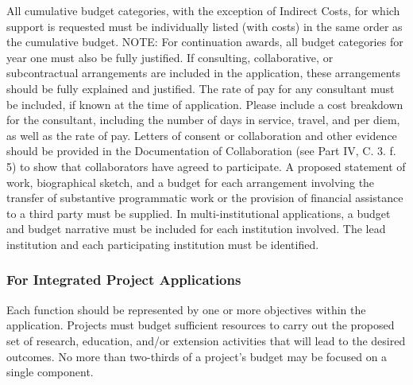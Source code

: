 \documentclass[12pt,letterpaper]{article}
\title{\ruleline{Budget Justification}}
\begin{document}
\maketitle
\linenumbers

All cumulative budget categories, with the exception of Indirect Costs, for
which support is requested must be individually listed (with costs) in the same
order as the cumulative budget. NOTE: For continuation awards, all budget
categories for year one must also be fully justified. If consulting,
collaborative, or subcontractual arrangements are included in the application,
these arrangements should be fully explained and justified. The rate of pay for
any consultant must be included, if known at the time of application. Please
include a cost breakdown for the consultant, including the number of days in
service, travel, and per diem, as well as the rate of pay. Letters of consent or
collaboration and other evidence should be provided in the Documentation of
Collaboration (see Part IV, C. 3. f. 5) to show that collaborators have agreed
to participate. A proposed statement of work, biographical sketch, and a budget
for each arrangement involving the transfer of substantive programmatic work or
the provision of financial assistance to a third party must be supplied. In
multi-institutional applications, a budget and budget narrative must be included
for each institution involved. The lead institution and each participating
institution must be identified.

\subsubsection{For Integrated Project Applications} 

Each function should be represented by one or more objectives within the
application. Projects must budget sufficient resources to carry out the proposed
set of research, education, and/or extension activities that will lead to the
desired outcomes. No more than two-thirds of a project's budget may be focused
on a single component.

\lipsum[1]
\end{document}

